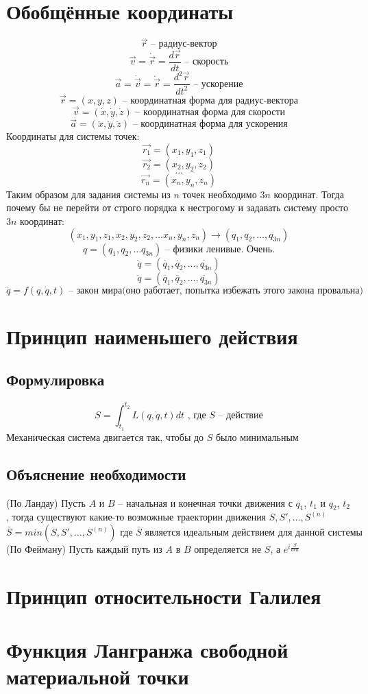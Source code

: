\documentclass[a4paper, 12pt, titlepage, fleqn]{article}
\newcommand{\T}{\textbf}
\begin{document}
	\begin{titlepage}
	\end{titlepage}
	\section{Обобщённые координаты} 
		\[
			\vec{r} \textbf{ -- радиус-вектор}
		\] 
		\[
			\vec{v} = \dot{\vec{r}} = \frac{d \vec{r}}{dt} \T{ -- скорость}
		\]
		\[
			\vec{a} = \dot{\vec{v}} = \ddot{\vec{r}} = \frac{d^2 \vec{r}}{dt^2} \T{ -- ускорение}
		\]
		\[
			\vec{r} = (x, y, z)  \T{ -- координатная форма для радиус-вектора}
		\]
		\[
			\vec{v} = (\dot{x}, \dot{y}, \dot{z}) \T{ -- координатная форма для скорости}
		\]
		\[
			\vec{a} = (\ddot{x}, \ddot{y}, \ddot{z}) \T{ -- координатная форма для ускорения}
		\]
		Координаты для системы точек:
		\[
			\vec{r_1} = (x_1, y_1, z_1) 
		\]
		\[
			\vec{r_2} = (x_2, y_2, z_2)
		\]
		\[
			\dots
		\]
		\[
			\vec{r_n} = (x_n, y_n, z_n)
		\]
		Таким образом для задания системы из $n$ точек необходимо $3n$ координат. Тогда почему бы не перейти от строго порядка к нестрогому и задавать систему просто $3n$ координат:
		\[
			(x_1, y_1, z_1, x_2, y_2, z_2, \dots x_n, y_n, z_n) \to (q_1, q_2, \dots, q_{3n})
		\]
		\[
			q = (q_1, q_2, \dots q_{3n}) \T{ -- физики ленивые. Очень.}
		\] 
		\[
			\dot{q} = (\dot{q_1}, \dot{q_2}, \dots, \dot{q_{3n}})
		\]
		\[
			\ddot{q} = (\ddot{q_1}, \ddot{q_2}, \dots, \ddot{q_{3n}})
		\]
		\[
			\ddot{q} = f(q, \dot{q}, t) \T{ -- закон мира(оно работает, попытка избежать этого закона провальна)}
		\]
	\section{Принцип наименьшего действия}
		\subsection{Формулировка}
			\[
				S = \int_{t_1}^{t_2} L(q, \dot{q}, t)dt \T{ , где } S \T{ -- действие}
			\]
			Механическая система двигается так, чтобы до $S$ было минимальным
		\subsection{Объяснение необходимости}
			(По Ландау) Пусть $A$ и $B$ -- начальная и конечная точки движения с $q_1$, $t_1$ и $q_2$, $t_2$, тогда существуют какие-то возможные траектории движения $S, S', \dots, S^{(n)}$
			\[
				\bar{S} = min(S, S', \dots, S^{(n)}) \T{ где } \bar{S} \T{ является идеальным действием для данной системы}
			\]
			(По Фейману) Пусть каждый путь из $A$ в $B$ определяется не $S$, а $e^{i\frac{S}{den}}$
	\section{Принцип относительности Галилея}
	\section{Функция Лангранжа свободной материальной точки}
\end{document}
